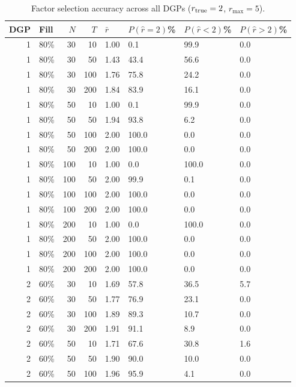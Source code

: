 \begin{table}[ht]
\centering
\caption{Factor selection accuracy across all DGPs ($r_{\rm true} = 2$, $r_{\max} = 5$).} 
\label{tab:mc_factor_sel}
\begin{tabular}{rlrrllll}
  \hline
DGP & Fill & $N$ & $T$ & $\bar r$ & $P(\hat r=2)$\% & $P(\hat r<2)$\% & $P(\hat r>2)$\% \\ 
  \hline
1 & 80\% & 30 & 10 & 1.00 & 0.1 & 99.9 & 0.0 \\ 
  1 & 80\% & 30 & 50 & 1.43 & 43.4 & 56.6 & 0.0 \\ 
  1 & 80\% & 30 & 100 & 1.76 & 75.8 & 24.2 & 0.0 \\ 
  1 & 80\% & 30 & 200 & 1.84 & 83.9 & 16.1 & 0.0 \\ 
  1 & 80\% & 50 & 10 & 1.00 & 0.1 & 99.9 & 0.0 \\ 
  1 & 80\% & 50 & 50 & 1.94 & 93.8 & 6.2 & 0.0 \\ 
  1 & 80\% & 50 & 100 & 2.00 & 100.0 & 0.0 & 0.0 \\ 
  1 & 80\% & 50 & 200 & 2.00 & 100.0 & 0.0 & 0.0 \\ 
  1 & 80\% & 100 & 10 & 1.00 & 0.0 & 100.0 & 0.0 \\ 
  1 & 80\% & 100 & 50 & 2.00 & 99.9 & 0.1 & 0.0 \\ 
  1 & 80\% & 100 & 100 & 2.00 & 100.0 & 0.0 & 0.0 \\ 
  1 & 80\% & 100 & 200 & 2.00 & 100.0 & 0.0 & 0.0 \\ 
  1 & 80\% & 200 & 10 & 1.00 & 0.0 & 100.0 & 0.0 \\ 
  1 & 80\% & 200 & 50 & 2.00 & 100.0 & 0.0 & 0.0 \\ 
  1 & 80\% & 200 & 100 & 2.00 & 100.0 & 0.0 & 0.0 \\ 
  1 & 80\% & 200 & 200 & 2.00 & 100.0 & 0.0 & 0.0 \\ 
  2 & 60\% & 30 & 10 & 1.69 & 57.8 & 36.5 & 5.7 \\ 
  2 & 60\% & 30 & 50 & 1.77 & 76.9 & 23.1 & 0.0 \\ 
  2 & 60\% & 30 & 100 & 1.89 & 89.3 & 10.7 & 0.0 \\ 
  2 & 60\% & 30 & 200 & 1.91 & 91.1 & 8.9 & 0.0 \\ 
  2 & 60\% & 50 & 10 & 1.71 & 67.6 & 30.8 & 1.6 \\ 
  2 & 60\% & 50 & 50 & 1.90 & 90.0 & 10.0 & 0.0 \\ 
  2 & 60\% & 50 & 100 & 1.96 & 95.9 & 4.1 & 0.0 \\ 

\end{tabular}
\end{table}
